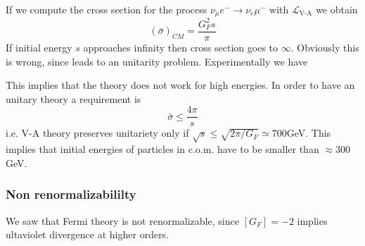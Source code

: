 \documentclass[TheoreticalPhy_ModB.tex]{subfiles}
\begin{document}
If we compute the cross section for the process $\nu_\mu e^-\to\nu_e\mu^-$ with $\mathcal L_{\text{V-A}}$ we obtain
\[(\bar\sigma)_{CM}=\frac{G_F^2s}{\pi}\]
If initial energy $s$ approaches infinity then cross section goes to $\infty$. Obviously this is wrong, since leads to an unitarity problem. Experimentally we have
\begin{figure}[H]
\centering

\end{figure}
\noindent This implies that the theory does not work for high energies. In order to have an unitary theory a requirement is 
\[\bar\sigma\leq\frac{4\pi}{s}\]
i.e. V-A theory preserves unitariety only if $\sqrt s\leq\sqrt{2\pi/G_F}\simeq 700$GeV. This implies that initial energies of particles in c.o.m. have to be smaller than $\approx 300$GeV.
\begin{figure}[H]
\centering

\end{figure}

\subsubsection{Non renormalizabililty}

We saw that Fermi theory is not renormalizable, since $[G_F]=-2$ implies ultaviolet divergence at higher orders.
\end{document}
